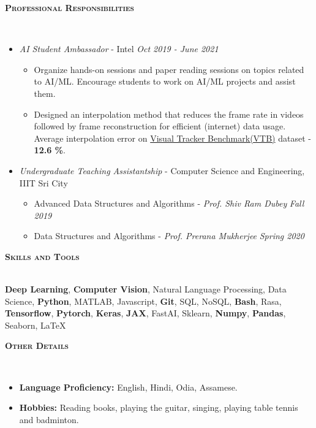 \documentclass[10pt]{article}
\renewcommand{\section}[1]{
\bigskip
  \begin{Large}
  {\textsc{\textbf{#1}}}
  \end{Large}
  \hrulefill
  \medskip
  \\
}
\newenvironment{lonemidlist}[1][\enskip\textbullet]%
        {\begin{itemize}[#1,leftmargin=*,parsep=0pt,itemsep=4pt,topsep=0pt,partopsep=0pt]}
        {\end{itemize}}
\begin{document}
\section{Professional Responsibilities}
\vspace{-4mm}
\begin{lonemidlist}

\item \textit{AI Student Ambassador} - Intel \hfill {\textit{Oct 2019 - June 2021}}
  \begin{itemize}
        \item Organize hands-on sessions and paper reading sessions on topics related to AI/ML. Encourage students to work on AI/ML projects and assist them.
        \item Designed an interpolation method that reduces the frame rate in videos followed by frame reconstruction for efficient (internet) data usage. Average interpolation error on \href{https://github.com/Debapriya-Tula/AdaConv-Pytorch}{Visual Tracker Benchmark(VTB)} dataset - \textbf{12.6 \%}.
  \end{itemize}
\item \textit{Undergraduate Teaching Assistantship} - Computer Science and Engineering, IIIT Sri City
  \begin{itemize}
        \item Advanced Data Structures and Algorithms - \textit{Prof. Shiv Ram Dubey} \hfill{\textit{Fall 2019}}
        \item Data Structures and Algorithms - \textit{Prof. Prerana Mukherjee} \hfill{\textit{Spring 2020}}
  \end{itemize}
\end{lonemidlist}


\section{Skills and Tools}
\textbf{Deep Learning}, \textbf{Computer Vision}, Natural Language Processing, Data Science, \textbf{Python}, MATLAB, Javascript, \textbf{Git}, SQL, NoSQL, \textbf{Bash}, Rasa, \textbf{Tensorflow}, \textbf{Pytorch}, \textbf{Keras}, \textbf{JAX}, FastAI, Sklearn, \textbf{Numpy}, \textbf{Pandas}, Seaborn, LaTeX

\section{Other Details}
\vspace{-4mm}
\begin{lonemidlist}

\item \textbf{Language Proficiency:} English, Hindi, Odia, Assamese.
\item \textbf{Hobbies:} Reading books, playing the guitar, singing, playing table tennis and badminton.
\end{lonemidlist}
\end{document}
